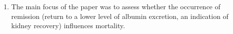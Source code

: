 \begin{enumerate}

\item The main focus of the paper was to assess whether the occurrence
  of remission (return to a lower level of albumin excretion, an
  indication of kidney recovery) influences mortality.


\end{enumerate}
